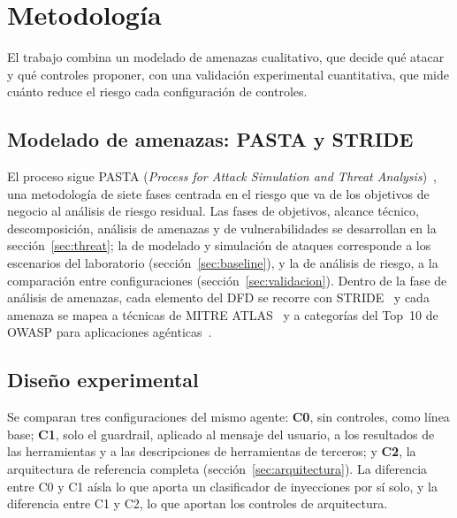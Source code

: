 \documentclass[11pt,a4paper]{article}
\newcommand{\atlas}[1]{\textsc{#1}}
\begin{document}
\section{Metodología}
\label{sec:metodo}
El trabajo combina un modelado de amenazas cualitativo, que decide qué atacar y qué controles proponer, con una
validación experimental cuantitativa, que mide cuánto reduce el riesgo cada configuración de controles.

\subsection{Modelado de amenazas: PASTA y STRIDE}
El proceso sigue PASTA (\emph{Process for Attack Simulation and Threat Analysis})~\cite{pasta2015}, una
metodología de siete fases centrada en el riesgo que va de los objetivos de negocio al análisis de riesgo
residual. Las fases de objetivos, alcance técnico, descomposición, análisis de amenazas y de vulnerabilidades
se desarrollan en la sección~\ref{sec:threat}; la de modelado y simulación de ataques corresponde a los
escenarios del laboratorio (sección~\ref{sec:baseline}), y la de análisis de riesgo, a la comparación entre
configuraciones (sección~\ref{sec:validacion}). Dentro de la fase de análisis de amenazas, cada elemento del
DFD se recorre con STRIDE~\cite{shostack2014} y cada amenaza se mapea a técnicas de
\atlas{MITRE ATLAS}~\cite{mitre_atlas} y a categorías del Top~10 de OWASP para aplicaciones
agénticas~\cite{owasp_asi_2026}.

\subsection{Diseño experimental}
Se comparan tres configuraciones del mismo agente: \textbf{C0}, sin controles, como línea base;
\textbf{C1}, solo el guardrail, aplicado al mensaje del usuario, a los resultados de las herramientas y a las
descripciones de herramientas de terceros; y \textbf{C2}, la arquitectura de referencia completa
(sección~\ref{sec:arquitectura}). La diferencia entre C0 y C1 aísla lo que aporta un clasificador de inyecciones
por sí solo, y la diferencia entre C1 y C2, lo que aportan los controles de arquitectura.
\end{document}
